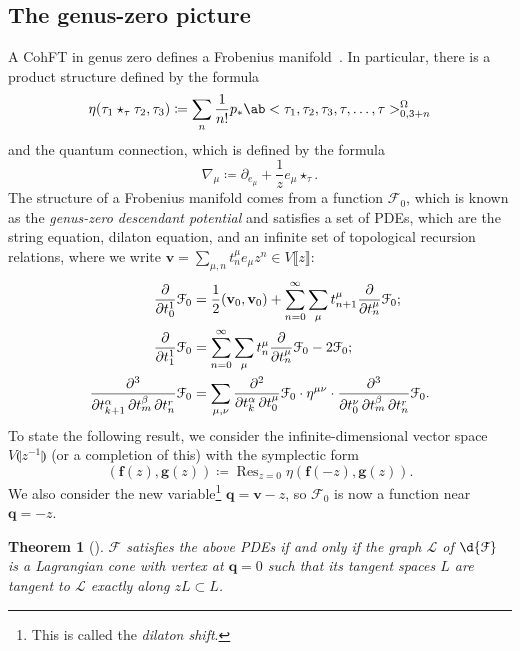 \documentclass[10pt]{amsart}
\newtheorem{thm}{Theorem}[section]
\theoremstyle{definition}
\theoremstyle{remark}
\theoremstyle{plain}
\theoremstyle{definition}
\theoremstyle{remark}
\newcommand{\mc}[1]{\mathcal{#1}}
\newcommand{\mbf}[1]{\mathbf{#1}}
\newcommand{\bv}{\mbf{v}}
\newcommand{\bq}{\mbf{q}}
\newcommand{\on}[1]{\operatorname{#1}}
\newcommand{\1}{\mathbf{1}}
\newcommand{\2}{\mathbf{2}}
\newcommand{\3}{\mathbf{3}}
\newcommand{\ps}[1]{\llbracket #1 \rrbracket}
\newcommand{\ls}[1]{\llparenthesis #1 \rrparenthesis}
\begin{document}
\subsection{The genus-zero picture}%
\label{sub:The genus-zero picture}

A CohFT in genus zero defines a Frobenius manifold~\cite{geom2dtft}. In particular, there is a product structure defined by the formula
\[ \eta(\tau_1 \star_{\tau} \tau_2, \tau_3) \coloneqq \sum_n \frac{1}{n!} p_* \ab<\tau_1, \tau_2, \tau_3, \tau,\ldots, \tau>_{0,3+n}^{\Omega} \]
and the quantum connection, which is defined by the formula
\[ \nabla_{\mu} \coloneqq \partial_{e_{\mu}} + \frac{1}{z} e_{\mu} \star_{\tau}. \]
The structure of a Frobenius manifold comes from a function $\mc{F}_0$, which is known as the \textit{genus-zero descendant potential} and satisfies a set of PDEs, which are the string equation, dilaton equation, and an infinite set of topological recursion relations, where we write $\bv = \sum_{\mu,n} t^{\mu}_n e_{\mu} z^n \in V\ps{z}$:
\begin{align*}
    \pdv{}{t_0^1} \mc{F}_0 &= \frac{1}{2} (\bv_0, \bv_0) + \sum_{n=0}^{\infty} \sum_{\mu} t_{n+1}^{\mu} \pdv{}{t_n^{\mu}} \mc{F}_0; \\
    \pdv{}{t_1^1} \mc{F}_0 &= \sum_{n=0}^{\infty} \sum_{\mu} t_n^{\mu} \pdv{}{t_n^{\mu}}\mc{F}_0 - 2 \mc{F}_0; \\
    \pdv{}{t_{k+1}^{\alpha},t_m^{\beta},t_n^{r}} \mc{F}_0 &= \sum_{\mu,\nu} \pdv{}{t_k^{\alpha},t_0^{\mu}} \mc{F}_0 \cdot \eta^{\mu\nu} \cdot \pdv{}{t_0^{\nu},t_{m}^{\beta},t_n^{r}} \mc{F}_0.
\end{align*}
To state the following result, we consider the infinite-dimensional vector space $V\ls{z^{-1}}$ (or a completion of this) with the symplectic form
\[ (\mbf{f}(z), \mbf{g}(z)) \coloneqq \on{Res}_{z=0}\eta(\mbf{f}(-z), \mbf{g}(z)). \]
We also consider the new variable\footnote{This is called the \textit{dilaton shift}.} $\bq = \bv - z$, so $\mc{F}_0$ is now a function near $\bq = -z$.

\begin{thm}[{\cite{symplfrob}}]
    $\mc{F}$ satisfies the above PDEs if and only if the graph $\mc{L}$ of $\d{\mc{F}}$ is a Lagrangian cone with vertex at $\bq = 0$ such that its tangent spaces $L$ are tangent to $\mc{L}$ exactly along $zL \subset L$.
\end{thm}
\end{document}
